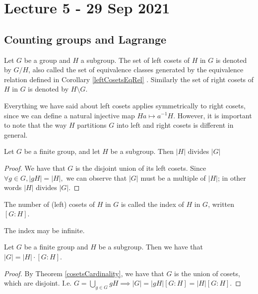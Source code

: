 \section{Lecture 5 - 29 Sep 2021}
\subsection{Counting groups and Lagrange}
\begin{definition}
  Let $G$ be a group and $H$ a subgroup. The set of left cosets of $H$ in $G$ is denoted
  by $G/H$, also called the set of equivalence classes generated by the equivalence
  relation defined in Corollary \ref{leftCosetsEqRel} . Similarly the set of right cosets of
  $H$ in $G$ is denoted by $H\setminus G$.
  \label{cosets}
\end{definition}
Everything we have said about left cosets applies symmetrically to right cosets, since we can define a natural injective map $Ha\mapsto a^{-1}H$.
However, it is important to note that the way $H$ partitions $G$ into left and right cosets is different in general. 

\begin{theorem}
  Let $G$ be a finite group, and let $H$ be a subgroup. Then $|H|$ divides $|G|$
\end{theorem}

\begin{proof}
    We have that $G$ is the disjoint union of its left cosets. Since $\forall g \in G, |gH| = |H|,$ we can observe that $|G|$ must be a multiple of $|H|$; in other words $|H|$ divides $|G|$.
\end{proof}

\begin{definition}
  The number of (left) cosets of $H$ in $G$ is called the index of $H$ in $G$, written
  $[G:H]$.
\end{definition}
The index may be infinite.

\begin{corollary}
  Let $G$ be a finite group and $H$ be a subgroup. Then we have that $|G|=|H| \cdot [G:H]$.
  \label{lagrange}
\end{corollary}
\begin{proof}
  By Theorem \ref{cosetsCardinality}, we have that $G$ is the union of cosets, which are
  disjoint. I.e. $G=\bigcup_{g\in G} gH\implies |G|=|gH|[G:H]=|H|[G:H]$.
\end{proof}

